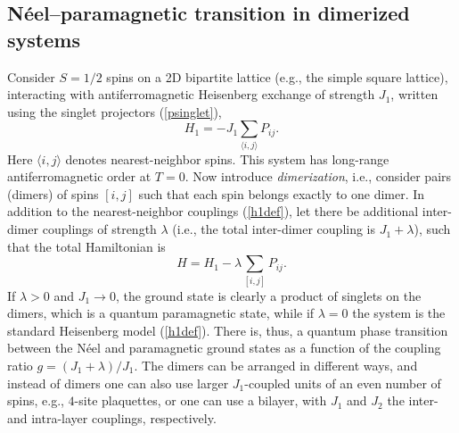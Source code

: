 \documentclass[range]{ar2e}
\begin{document}
\subsection{N\'eel--paramagnetic transition in dimerized systems}

Consider $S=1/2$ spins on a 2D bipartite lattice (e.g., the simple square lattice), interacting with antiferromagnetic Heisenberg exchange of 
strength $J_1$, written using the singlet projectors (\ref{psinglet}),
\begin{equation}
H_1 = -J_1 \sum_{\langle i,j\rangle} P_{ij}.
\label{h1def}
\end{equation}
Here $\langle i,j\rangle$ denotes nearest-neighbor spins. This system has long-range antiferromagnetic order at $T=0$. Now introduce {\it dimerization}, 
i.e., consider pairs (dimers) of spins $[i,j]$ such that each spin belongs exactly to one dimer. In addition to the nearest-neighbor couplings (\ref{h1def}),
let there be additional inter-dimer couplings of strength $\lambda$ (i.e., the total inter-dimer coupling is $J_1+\lambda$), such that the total Hamiltonian is
\begin{equation}
H = H_1  -\lambda \sum_{[ i,j]} P_{ij} .
\end{equation}
If $\lambda>0$ and $J_1\to 0$, the ground state is clearly a product of singlets on the dimers, which is a quantum paramagnetic state, while if $\lambda=0$ 
the system is the standard Heisenberg model (\ref{h1def}). There is, thus, a quantum phase transition between the N\'eel and paramagnetic ground states as a 
function of the coupling ratio $g=(J_1+\lambda)/J_1$. The dimers can be arranged in different ways, and instead of dimers one can also use larger $J_1$-coupled 
units of an even number of spins, e.g., $4$-site plaquettes, or one can use a bilayer, with $J_1$ and $J_2$ the inter-and intra-layer couplings, respectively.
\end{document}
